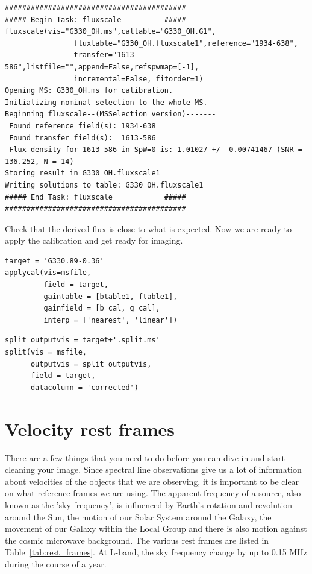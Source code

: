 \documentclass[force,almostfull,justified]{tufte-book}
\begin{document}
\begin{casaoutput}
\begin{verbatim}
##########################################
##### Begin Task: fluxscale          #####
fluxscale(vis="G330_OH.ms",caltable="G330_OH.G1",
                fluxtable="G330_OH.fluxscale1",reference="1934-638",
                transfer="1613-586",listfile="",append=False,refspwmap=[-1],
                incremental=False, fitorder=1)
Opening MS: G330_OH.ms for calibration.
Initializing nominal selection to the whole MS.
Beginning fluxscale--(MSSelection version)-------
 Found reference field(s): 1934-638
 Found transfer field(s):  1613-586
 Flux density for 1613-586 in SpW=0 is: 1.01027 +/- 0.00741467 (SNR = 136.252, N = 14)
Storing result in G330_OH.fluxscale1
Writing solutions to table: G330_OH.fluxscale1
##### End Task: fluxscale            #####
##########################################
\end{verbatim}
\end{casaoutput}

Check that the derived flux is close to what is expected.  Now we are ready to apply the calibration
and get ready for imaging.

\begin{casacmd}
\begin{verbatim}
target = 'G330.89-0.36'
applycal(vis=msfile,
         field = target,
         gaintable = [btable1, ftable1],
         gainfield = [b_cal, g_cal],
         interp = ['nearest', 'linear'])
\end{verbatim}
\end{casacmd}

\begin{casacmd}
\begin{verbatim}
split_outputvis = target+'.split.ms'
split(vis = msfile,
      outputvis = split_outputvis,
      field = target,
      datacolumn = 'corrected')
\end{verbatim}
\end{casacmd}


\section{Velocity rest frames}

There are a few things that you need to do before you can dive in and start cleaning your image.
Since spectral line observations give us a lot of information about velocities of the objects that we
are observing, it is important to be clear on what reference frames we are using.  The apparent
frequency of a source, also known as the 'sky frequency', is influenced by Earth's rotation and
revolution around the Sun, the motion of our Solar System around the Galaxy, the movement of our
Galaxy within the Local Group and there is also motion against the cosmic microwave background.  The
various rest frames are listed in Table~\ref{tab:rest_frames}. At L-band, the sky frequency change by
up to 0.15 MHz during the course of a year.
\end{document}
